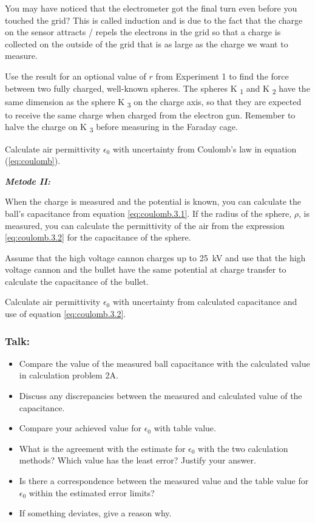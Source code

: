 \documentclass[../Elmag-labhefte-2020.tex]{subfiles}
\begin{document}
You may have noticed that the electrometer got the final turn even before you touched the grid? This is called induction and is due to the fact that the charge on the sensor attracts / repels the electrons in the grid so that a charge is collected on the outside of the grid that is as large as the charge we want to measure.

Use the result for an optional value of $r$ from Experiment 1 to find the force between two fully charged, well-known spheres. The spheres K \textsubscript{1} and K \textsubscript{2} have the same dimension as the sphere K \textsubscript{3} on the charge axis, so that they are expected to receive the same charge when charged from the electron gun. Remember to halve the charge on K \textsubscript{3} before measuring in the Faraday cage.

{\itsf Calculate air permittivity $\epsilon_0$ with uncertainty from Coulomb's law in equation (\ref{eq:coulomb}).}

\textbf{\emph{Metode II:}}

When the charge is measured and the potential is known, you can calculate the ball's capacitance from equation \eqref{eq:coulomb.3.1}. If the radius of the sphere, $\rho$, is measured, you can calculate the permittivity of the air from the expression \eqref{eq:coulomb.3.2} for the capacitance of the sphere.

Assume that the high voltage cannon charges up to \SI{25}{\kilo\volt} and use that the high voltage cannon and the bullet have the same potential at charge transfer to calculate the capacitance of the bullet.

{\itsf   Calculate air permittivity $\epsilon_0$ with uncertainty from calculated capacitance and use of equation \eqref{eq:coulomb.3.2}.}

\subsubsection{Talk:}
\begin{itemize}
    \item Compare the value of the measured ball capacitance with the calculated value in calculation problem 2A.
    \item Discuss any discrepancies between the measured and calculated value of the capacitance.
     \item Compare your achieved value for $\epsilon_0$ with table value.
    \item What is the agreement with the estimate for $\epsilon_0$ with the two calculation methods? Which value has the least error? Justify your answer.
    \item Is there a correspondence between the measured value and the table value for $\epsilon_0$ within the estimated error limits?
    \item If something deviates, give a reason why.
\end{itemize}
\end{document}
